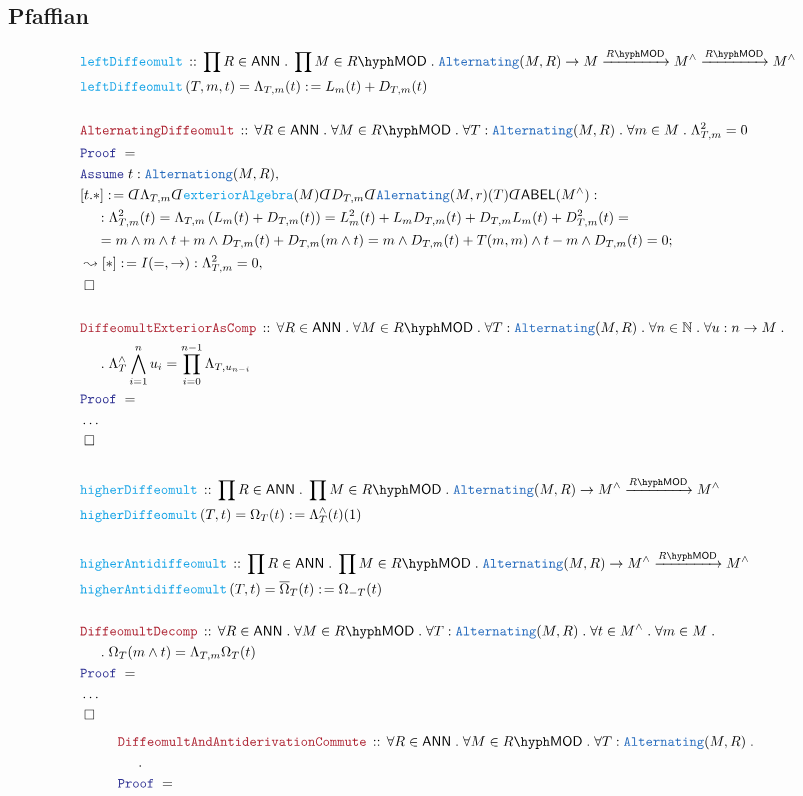 \documentclass[12pt]{scrartcl}%
\newcommand{\TYPE}[1]{\textcolor{NavyBlue}{\mathtt{#1}}}%
\newcommand{\FUNC}[1]{\textcolor{Cerulean}{\mathtt{#1}}}%
\newcommand{\LOGIC}[1]{\textcolor{Blue}{\mathtt{#1}}}%
\newcommand{\THM}[1]{\textcolor{Maroon}{\mathtt{#1}}}%
\renewcommand{\.}{\; . \;} %
\newcommand{\de}{: \kern 0.1pc =} %
\newcommand{\Act}[1]{\left( #1 \right)} %
\newcommand{\Theorem}[2]{& \THM{#1} \, :: \, #2 \\ & \Proof = \\ } %
\newcommand{\DeclareFunc}[2]{& \FUNC{#1} \, :: \, #2 \\}%
\newcommand{\DefineNamedFunc}[4]{&  \FUNC{#1}\Act{#2} = #3 \de #4 \\}%
\newcommand{\NewLine}{\\ & \kern 1pc}%
\newcommand{\Page}[1]{ \begin{align*} #1 \end{align*}  }%
\newcommand{ \bd }{ \ByDef }%
\newcommand{\NoProof}{ & \ldots \\ \EndProof}%
\newcommand{\Nat}{\mathbb{N}}%
\newcommand{\Conclude}[3]{& #1 \de #2 : #3; \\}%
\newcommand{\Derive}[3]{& \leadsto #1 \de #2 : #3, \\} %
\newcommand{\Assume}[2]{& \LOGIC{Assume} \; #1 : #2, \\} %
\newcommand{\QED}{\; \square} %
\newcommand{\EndProof}{& \QED \\} %
\newcommand{\ByDef}{\rotatebox[origin=c]{-180}{$D$}}%
\newcommand{\Proof}{\LOGIC{Proof} \; } %
\newcommand{\Arrow}[1]{\xrightarrow{#1}}%
\newcommand{\ABEL}{\mathsf{ABEL}} %
\newcommand{\LMOD}[1]{#1\hyph\mathsf{MOD}} %
\newcommand{\ANN}{\mathsf{ANN}} %
\begin{document}
\subsection{Pfaffian}
\Page{
	\DeclareFunc{leftDiffeomult}{\prod R \in \ANN \. \prod M \in \LMOD{R} \. \TYPE{Alternating}(M,R)  \to M \Arrow{\LMOD{R}} M^\wedge \Arrow{\LMOD{R}} M^\wedge}
	\DefineNamedFunc{leftDiffeomult}{T,m,t}{\Lambda_{T,m}(t)}{  L_m(t) + D_{T,m}(t)  }
	\\
	\Theorem{AlternatingDiffeomult}
	{
		\forall R \in \ANN \. 
		\forall M \in \LMOD{R} \.
		\forall T : \TYPE{Alternating}(M,R) \. 
		\forall m \in M \. 
		\Lambda_{T,m}^2 = 0
	}
	\Assume{t}{\TYPE{Alternationg}(M,R)}
	\Conclude{[t.*]}{\bd \Lambda_{T,m} \bd \FUNC{exteriorAlgebra}(M) \bd D_{T,m} \bd \TYPE{Alernating}(M,r)(T) \bd \ABEL(M^\wedge)  }{ 
		\NewLine :
		\Lambda_{T,m}^2(t) = 
		\Lambda_{T,m} \left(  L_m(t)  + D_{T,m}(t) \right) = 
		L^2_m(t)   + L_m D_{T,m}(t)  + D_{T,m} L_m(t) + D^2_{T,m}(t) = \NewLine =  
		m \wedge m \wedge t  + m \wedge D_{T,m}(t) + D_{T,m}(m \wedge t) =
		m \wedge D_{T,m}(t)  + T(m,m) \wedge t  - m \wedge D_{T,m}(t) = 0
	}
	\Derive{[*]}{I(=,\to)}{ \Lambda_{T,m}^2 = 0 }
	\EndProof
	\\
	\Theorem{DiffeomultExteriorAsComp}
	{
		\forall R \in \ANN \. 
		\forall M \in \LMOD{R} \.
		\forall T : \TYPE{Alternating}(M,R) \. 
		\forall n \in \Nat \. 
		\forall u : n \to M \. \NewLine \.  
		\Lambda_T^{\wedge} \bigwedge^n_{i=1} u_i =  
		\prod^{n-1}_{i=0} \Lambda_{T,u_{n-i}}
	}
	\NoProof
	\\
	\DeclareFunc{higherDiffeomult}
	{
		\prod R \in \ANN \. 
		\prod M \in \LMOD{R} \.
		\TYPE{Alternating}(M,R) \to
		M^\wedge \Arrow{\LMOD{R}} M^\wedge
	}
	\DefineNamedFunc{higherDiffeomult}
	{
		T,t
	}
	{
		\Omega_T(t)
	}
	{
		\Lambda^\wedge_{T}(t)(1)
	}
	\\
	\DeclareFunc{higherAntidiffeomult}
	{
		\prod R \in \ANN \. 
		\prod M \in \LMOD{R} \.
		\TYPE{Alternating}(M,R) \to
		M^\wedge \Arrow{\LMOD{R}} M^\wedge
	}
	\DefineNamedFunc{higherAntidiffeomult}
	{
		T,t
	}
	{
		\overline{\Omega}_T(t)
	}
	{
		\Omega_{-T}(t)
	}
	\\
	\Theorem{DiffeomultDecomp}
	{
		\forall R \in \ANN \.
		\forall M \in \LMOD{R} \. 
		\forall T : \TYPE{Alternating}(M,R) \.
		\forall t \in M^\wedge \.
		\forall m \in M \. \NewLine \. 
		\Omega_T(m \wedge t) = \Lambda_{T,m}\Omega_{T}(t)
	}
	\NoProof
}\Page{
	\Theorem{DiffeomultAndAntiderivationCommute}
	{
		\forall R \in \ANN \.
		\forall M \in \LMOD{R} \. 
		\forall T : \TYPE{Alternating}(M,R) \.
		\NewLine \. 
}}
\end{document}
